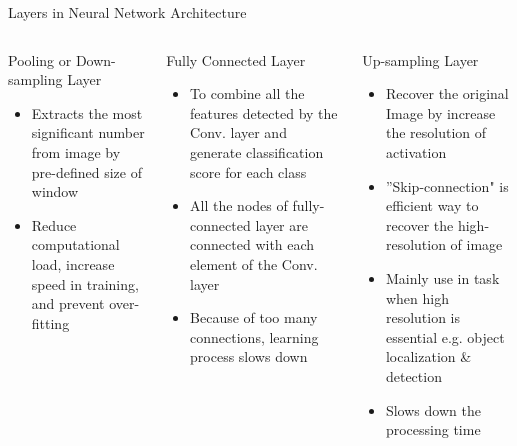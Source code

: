\documentclass[10pt]{beamer}
\begin{document}
\begin{frame}{Layers in Neural Network Architecture}
    \begin{columns}
        \begin{block}{Pooling or Down-sampling Layer}
         \begin{itemize}
             \item Extracts the most significant number from image by pre-defined size of window
             \item Reduce computational load, increase speed in training, and prevent over-fitting
         \end{itemize}             
        \end{block}
        \vspace{-5pt}
        \begin{block}{Fully Connected Layer}
         \begin{itemize}
             \item To combine all the features detected by the Conv. layer and generate classification score for each class
             \item All the nodes of fully-connected layer are connected with each element of the Conv. layer
             \item Because of too many connections, learning process slows down 
         \end{itemize}
        \end{block}

        \begin{block}{Up-sampling Layer}
             \begin{itemize}
                \item Recover the original Image by increase the resolution of activation 
                \item ''Skip-connection" is efficient way to recover the high-resolution of image
                \item Mainly use in task when high resolution is essential e.g. object localization \& detection
                \item Slows down the processing time 
            \end{itemize}
        \end{block} 
    \end{columns}
\end{frame}

\end{document}
